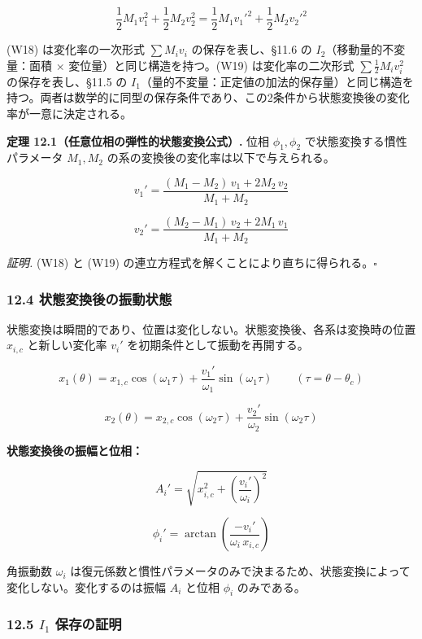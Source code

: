\documentclass[a4paper,11pt]{ltjsarticle}
\begin{document}
\[\frac{1}{2}M_1 v_1^2 + \frac{1}{2}M_2 v_2^2 = \frac{1}{2}M_1 v_1'^2 + \frac{1}{2}M_2 v_2'^2 \tag{W19}\]

(W18) は変化率の一次形式 \(\sum M_i v_i\) の保存を表し、§11.6 の
\(I_2\)（移動量的不変量：面積 \(\times\) 変位量）と同じ構造を持つ。(W19)
は変化率の二次形式 \(\sum \frac{1}{2}M_i v_i^2\) の保存を表し、§11.5 の
\(I_1\)（量的不変量：正定値の加法的保存量）と同じ構造を持つ。両者は数学的に同型の保存条件であり、この2条件から状態変換後の変化率が一意に決定される。

\textbf{定理 12.1（任意位相の弾性的状態変換公式）.} 位相
\(\phi_1, \phi_2\) で状態変換する慣性パラメータ \(M_1, M_2\)
の系の変換後の変化率は以下で与えられる。

\[v_1' = \frac{(M_1 - M_2)\,v_1 + 2M_2\,v_2}{M_1 + M_2} \tag{W20}\]

\[v_2' = \frac{(M_2 - M_1)\,v_2 + 2M_1\,v_1}{M_1 + M_2} \tag{W21}\]

\emph{証明.} (W18) と (W19)
の連立方程式を解くことにより直ちに得られる。\(\square\)

\subsubsection{12.4
状態変換後の振動状態}\label{ux72b6ux614bux5909ux63dbux5f8cux306eux632fux52d5ux72b6ux614b}

状態変換は瞬間的であり、位置は変化しない。状態変換後、各系は変換時の位置
\(x_{i,c}\) と新しい変化率 \(v_i'\) を初期条件として振動を再開する。

\[x_1(\theta) = x_{1,c}\cos(\omega_1\tau) + \frac{v_1'}{\omega_1}\sin(\omega_1\tau) \qquad (\tau = \theta - \theta_c) \tag{W22}\]

\[x_2(\theta) = x_{2,c}\cos(\omega_2\tau) + \frac{v_2'}{\omega_2}\sin(\omega_2\tau) \tag{W23}\]

\textbf{状態変換後の振幅と位相：}

\[A_i' = \sqrt{x_{i,c}^2 + \left(\frac{v_i'}{\omega_i}\right)^2} \tag{W24}\]

\[\phi_i' = \arctan\!\left(\frac{-v_i'}{\omega_i\, x_{i,c}}\right) \tag{W25}\]

角振動数 \(\omega_i\)
は復元係数と慣性パラメータのみで決まるため、状態変換によって変化しない。変化するのは振幅
\(A_i\) と位相 \(\phi_i\) のみである。

\subsubsection{\texorpdfstring{12.5 \(I_1\)
保存の証明}{12.5 I\_1 保存の証明}}\label{i_1-ux4fddux5b58ux306eux8a3cux660e}
\end{document}
